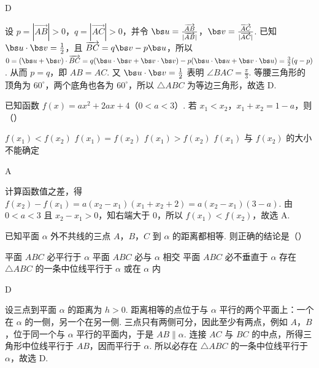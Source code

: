 \begin{answer}
D
\end{answer}

\begin{solution}
设 \(p=|\overrightarrow{AB}|>0\)，\(q=|\overrightarrow{AC}|>0\)，并令 \(\bs u=\frac{\overrightarrow{AB}}{|\overrightarrow{AB}|}\)，\(\bs v=\frac{\overrightarrow{AC}}{|\overrightarrow{AC}|}\). 已知 \(\bs u\cdot\bs v=\frac12\)，且 \(\overrightarrow{BC}=q\bs v-p\bs u\)，所以 \(0=(\bs u+\bs v)\cdot\overrightarrow{BC}=q(\bs u\cdot\bs v+\bs v\cdot\bs v)-p(\bs u\cdot\bs u+\bs v\cdot\bs u)=\frac32(q-p)\). 从而 \(p=q\)，即 \(AB=AC\). 又 \(\bs u\cdot\bs v=\frac12\) 表明 \(\angle BAC=\frac\pi3\). 等腰三角形的顶角为 \(60^{\circ}\)，两个底角也各为 \(60^{\circ}\)，所以 \(\triangle ABC\) 为等边三角形，故选 D.
\end{solution}

\begin{problem}
已知函数 \( f(x) = ax^2 + 2ax + 4 \)（\(0 < a < 3\)）. 若 \(x_1 < x_2\)，\(x_1 + x_2 = 1 - a\)，则（\quad）

\choices
    {\(f(x_{1}) < f(x_{2})\)}
    {\(f(x_{1}) = f(x_{2})\)}
    {\(f(x_{1}) > f(x_{2})\)}
    {\(f(x_{1})\) 与 \(f(x_{2})\) 的大小不能确定}
\end{problem}

\begin{answer}
A
\end{answer}

\begin{solution}
计算函数值之差，得 \(f(x_2)-f(x_1)=a(x_2-x_1)(x_1+x_2+2)=a(x_2-x_1)(3-a)\). 由 \(0<a<3\) 且 \(x_2-x_1>0\)，知右端大于 0，所以 \(f(x_1)<f(x_2)\)，故选 A.
\end{solution}

\begin{problem}
已知平面 \(\alpha\) 外不共线的三点 \(A\)，\(B\)，\(C\) 到 \(\alpha\) 的距离都相等. 则正确的结论是（\quad）

\choices
    {平面 \(ABC\) 必平行于 \(\alpha\)}
    {平面 \(ABC\) 必与 \(\alpha\) 相交}
    {平面 \(ABC\) 必不垂直于 \(\alpha\)}
    {存在 \(\triangle ABC\) 的一条中位线平行于 \(\alpha\) 或在 \(\alpha\) 内}
\end{problem}

\begin{answer}
D
\end{answer}

\begin{solution}
设三点到平面 \(\alpha\) 的距离为 \(h>0\). 距离相等的点位于与 \(\alpha\) 平行的两个平面上：一个在 \(\alpha\) 的一侧，另一个在另一侧. 三点只有两侧可分，因此至少有两点，例如 \(A\)，\(B\)，位于同一个与 \(\alpha\) 平行的平面内，于是 \(AB\parallel\alpha\). 连接 \(AC\) 与 \(BC\) 的中点，所得三角形中位线平行于 \(AB\)，因而平行于 \(\alpha\). 所以必存在 \(\triangle ABC\) 的一条中位线平行于 \(\alpha\)，故选 D.
\end{solution}

